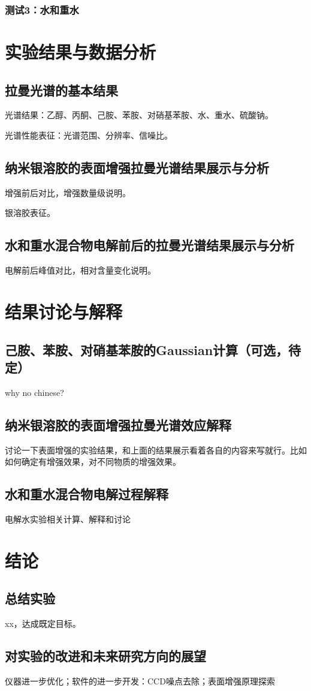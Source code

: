 \documentclass[UTF8]{article}
\begin{document}
	\subsubsection{测试3：水和重水}

	
	\section{实验结果与数据分析}
	\subsection{拉曼光谱的基本结果}
	光谱结果：乙醇、丙酮、己胺、苯胺、对硝基苯胺、水、重水、硫酸钠。

	光谱性能表征：光谱范围、分辨率、信噪比。

	\subsection{纳米银溶胶的表面增强拉曼光谱结果展示与分析}
	增强前后对比，增强数量级说明。

	银溶胶表征。

	\subsection{水和重水混合物电解前后的拉曼光谱结果展示与分析}
	电解前后峰值对比，相对含量变化说明。

	
	\section{结果讨论与解释}
	\subsection{己胺、苯胺、对硝基苯胺的Gaussian计算（可选，待定）}
	why no chinese?

	\subsection{纳米银溶胶的表面增强拉曼光谱效应解释}
	讨论一下表面增强的实验结果，和上面的结果展示看着各自的内容来写就行。比如如何确定有增强效果，对不同物质的增强效果。

	\subsection{水和重水混合物电解过程解释 }
	电解水实验相关计算、解释和讨论
	
	\section{结论}
	\subsection{总结实验}
	xx，达成既定目标。

	\subsection{对实验的改进和未来研究方向的展望}
	仪器进一步优化；软件的进一步开发：CCD噪点去除；表面增强原理探索
	
	
	
	


	
\end{document}
